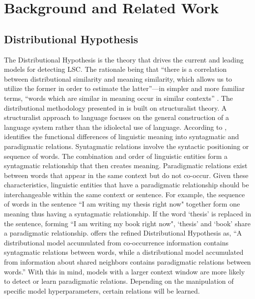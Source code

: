 \section{Background and Related Work}
\label{sec:background}

\subsection{Distributional Hypothesis}

The Distributional Hypothesis is the theory that drives the current and leading models for detecting LSC. The rationale being that “there is a correlation between distributional similarity and meaning similarity, which allows us to utilize the former in order to estimate the latter”—in simpler and more familiar terms, “words which are similar in meaning occur in similar contexts” \citep{sahlgren2008distributional}. The distributional methodology presented in \citet{harris1954distributional} is built on structuralist theory. A structuralist approach to language focuses on the general construction of a language system rather than the idiolectal use of language. According to \citet{sahlgren2008distributional}, \citet{saussure1916} identifies the functional differences of linguistic meaning into syntagmatic and paradigmatic relations. Syntagmatic relations involve the syntactic positioning or sequence of words. The combination and order of linguistic entities form a syntagmatic relationship that then creates meaning. Paradigmatic relations exist between words that appear in the same context but do not co-occur. Given these characteristics, linguistic entities that have a paradigmatic relationship should be interchangeable within the same context or sentence. For example, the sequence of words in the sentence ``I am writing my thesis right now" together form one meaning thus having a syntagmatic relationship. If the word `thesis' is replaced in the sentence, forming ``I am writing my book right now", `thesis' and `book' share a paradigmatic relationship. \citet{sahlgren2008distributional} offers the refined Distributional Hypothesis as, “A distributional model accumulated from co-occurrence information contains syntagmatic relations between words, while a distributional model accumulated from information about shared neighbors contains paradigmatic relations between words.” With this in mind, models with a larger context window are more likely to detect or learn paradigmatic relations. Depending on the manipulation of specific model hyperparameters, certain relations will be learned. 


